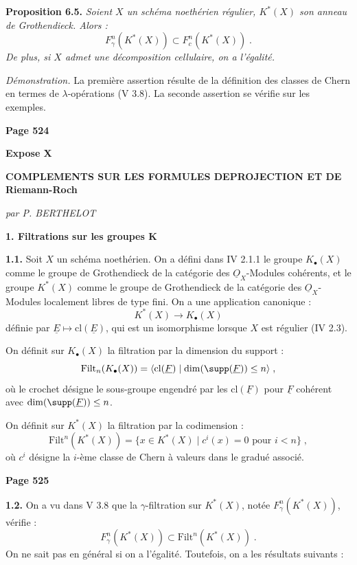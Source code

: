 \smallskip
\noindent\textbf{Proposition 6.5.} \textit{Soient $X$ un sch\'ema noeth\'erien r\'egulier, $K^*(X)$ son anneau de Grothendieck. Alors :
\[
F_\gamma^n(K^*(X)) \subset F_c^n(K^*(X))\;.
\]
De plus, si $X$ admet une d\'ecomposition cellulaire, on a l'\'egalit\'e.}

\textit{D\'emonstration.} La premi\`ere assertion r\'esulte de la d\'efinition des classes de Chern en termes de $\lambda$-op\'erations (V 3.8). La seconde assertion se v\'erifie sur les exemples.

\newpage
\noindent\textbf{Page 524}

\noindent\textbf{Expose X}

\begin{center}
\textbf{COMPLEMENTS SUR LES FORMULES DE\break PROJECTION ET DE Riemann-Roch}

\medskip
\textit{par P. BERTHELOT}
\end{center}

\bigskip
\noindent\textbf{1. Filtrations sur les groupes K}

\smallskip
\noindent\textbf{1.1.} Soit $X$ un sch\'ema noeth\'erien. On a d\'efini dans IV 2.1.1 le groupe $K_\bullet(X)$ comme le groupe de Grothendieck de la cat\'egorie des $\underline{O}_X$-Modules coh\'erents, et le groupe $K^*(X)$ comme le groupe de Grothendieck de la cat\'egorie des $\underline{O}_X$-Modules localement libres de type fini. On a une application canonique :
\[
K^*(X) \longrightarrow K_\bullet(X)
\]
d\'efinie par $\underline{E} \mapsto \mathrm{cl}(\underline{E})$, qui est un isomorphisme lorsque $X$ est r\'egulier (IV 2.3).

On d\'efinit sur $K_\bullet(X)$ la filtration par la dimension du support :
\[
\mathrm{Filt}_n(K_\bullet(X)) = \langle \mathrm{cl}(\underline{F}) \mid \dim(\supp(\underline{F})) \leq n \rangle\;,
\]
o\`u le crochet d\'esigne le sous-groupe engendr\'e par les $\mathrm{cl}(\underline{F})$ pour $\underline{F}$ coh\'erent avec $\dim(\supp(\underline{F})) \leq n$.

On d\'efinit sur $K^*(X)$ la filtration par la codimension :
\[
\mathrm{Filt}^n(K^*(X)) = \{x \in K^*(X) \mid c^i(x) = 0 \text{ pour } i < n\}\;,
\]
o\`u $c^i$ d\'esigne la $i$-\`eme classe de Chern \`a valeurs dans le gradu\'e associ\'e.

\newpage
\noindent\textbf{Page 525}

\smallskip
\noindent\textbf{1.2.} On a vu dans V 3.8 que la $\gamma$-filtration sur $K^*(X)$, not\'ee $F_\gamma^n(K^*(X))$, v\'erifie :
\[
F_\gamma^n(K^*(X)) \subset \mathrm{Filt}^n(K^*(X))\;.
\]
On ne sait pas en g\'en\'eral si on a l'\'egalit\'e. Toutefois, on a les r\'esultats suivants :

